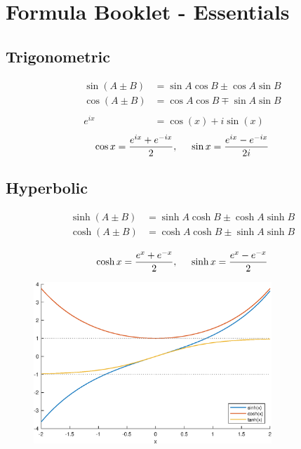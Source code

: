 \documentclass[a4paper,12pt]{article}
\begin{document}
\section*{Formula Booklet - Essentials}
\subsection*{Trigonometric}
\begin{equation*}
  \begin{split}
    \sin(A \pm B) &= \sin{A}\cos{B}\pm\cos{A}\sin{B}\\
    \cos(A \pm B) &= \cos{A}\cos{B}\mp\sin{A}\sin{B}\\\\
    e^{ix} &= \cos(x) + i\sin(x)
  \end{split}
\end{equation*}
$$\cos{x} = \frac{e^{ix} + e^{-ix}}{2},\hspace{5mm}\sin{x} = \frac{e^{ix} - e^{-ix}}{2i}$$

\subsection*{Hyperbolic}
\begin{equation*}
  \begin{split}
    \sinh(A \pm B) &= \sinh{A}\cosh{B}\pm\cosh{A}\sinh{B}\\
    \cosh(A \pm B) &= \cosh{A}\cosh{B}\pm\sinh{A}\sinh{B}\\
  \end{split}
\end{equation*}
$$\cosh{x} = \frac{e^x+e^{-x}}{2} ,\hspace{5mm}\sinh{x} = \frac{e^x-e^{-x}}{2}$$
\begin{figure}[h]
  \includegraphics[width=0.8\textwidth]{hyperbolic_figures.eps}
  \centering
\end{figure}
\end{document}
